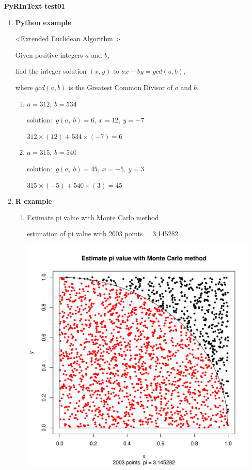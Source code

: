 \documentclass[a4paper]{article}
\begin{document}
	{\Large\bf PyRInText test01} %

	\begin{enumerate}
		\item {\bf Python example}

			\textless Extended Euclidean Algorithm \textgreater\vspace{1mm}\par
			Given positive integers $a$ and $b$,\par
			find the integer solution $(x, y)$ to $ax+by=gcd(a,b)$, \par
			where $gcd(a,b)$ is the Greatest Common Divisor of $a$ and $b$.
			\begin{enumerate}
				\item 
					$a= 312 ,~b= 534$\par
					solution:~$g(a,~b)=6,~x=12,~y=-7$\par
					$312\times(12)+534\times(-7)=6$
				\item 
					$a= 315 ,~b= 540$\par
					{\color{white}
					solution:~$g(a,~b)=45,~x=-5,~y=3$\par
					$315\times(-5)+540\times(3)=45$}

			\end{enumerate}

		\item {\bf R example}

			\begin{enumerate}
				\item Estimate pi value with Monte Carlo method\par
					estimation of pi value with 
						2003 points = 3.145282
					

					\includegraphics[scale=0.40,clip]{mc_pi.pdf}


\end{enumerate}
\end{enumerate}
\end{document}
